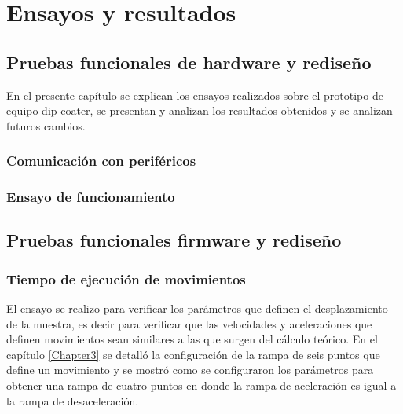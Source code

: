 
\chapter{Ensayos y resultados} %

\label{Chapter4} %


\section{Pruebas funcionales de hardware y rediseño}

En el presente capítulo se explican los ensayos realizados sobre el prototipo de equipo dip coater, se presentan y analizan los resultados obtenidos y se analizan futuros cambios.
\subsection{Comunicación con periféricos}

\subsection{Ensayo de funcionamiento}

\section{Pruebas funcionales firmware y rediseño}
\subsection{Tiempo de ejecución de movimientos}

El ensayo se realizo para verificar los parámetros que definen el desplazamiento de la muestra, es decir para verificar que las velocidades y aceleraciones que definen movimientos sean similares a las que surgen del cálculo teórico.
En el capítulo \ref{Chapter3} se detalló la configuración de la rampa de seis puntos que define un movimiento y se mostró como se configuraron los parámetros para obtener una rampa de cuatro puntos en donde la rampa de aceleración es igual a la rampa de desaceleración.

